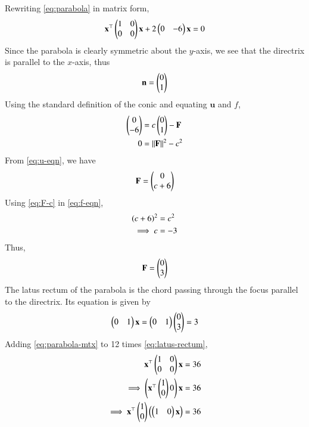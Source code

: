 \documentclass[journal,12pt,twocolumn]{IEEEtran}
\renewcommand{\vec}[1]{\boldsymbol{\mathbf{#1}}}
\begin{document}
\begin{enumerate}
    \solution Rewriting \eqref{eq:parabola} in matrix form,
    \begin{align}
        \vec{x}^\top\myvec{1&0\\0&0}\vec{x} + 2\myvec{0&-6}\vec{x} = 0
        \label{eq:parabola-mtx}
    \end{align}
    Since the parabola is clearly symmetric about the $y$-axis, we see that
    the directrix is parallel to the $x$-axis, thus
    \begin{align}
        \vec{n} = \myvec{0\\1}
        \label{eq:n}
    \end{align}
    Using the standard definition of the conic and equating $\vec{u}$ and $f$,
    \begin{align}
        \myvec{0\\-6} &= c\myvec{0\\1} - \vec{F} \label{eq:u-eqn} \\
        0 &= \norm{\vec{F}}^2 - c^2 \label{eq:f-eqn}
    \end{align}
    From \eqref{eq:u-eqn}, we have
    \begin{align}
        \vec{F} = \myvec{0\\c+6}
        \label{eq:F-c}
    \end{align}
    Using \eqref{eq:F-c} in \eqref{eq:f-eqn},
    \begin{align}
        \left(c+6\right)^2&=c^2 \\
        \implies c&=-3
        \label{eq:c-sol}
    \end{align}
    Thus,
    \begin{align}
        \vec{F} = \myvec{0\\3}
    \end{align}
    The latus rectum of the parabola is the chord passing through the focus 
    parallel to the directrix. Its equation is given by
    \begin{align}
        \myvec{0&1}\vec{x} = \myvec{0&1}\myvec{0\\3} = 3
        \label{eq:latus-rectum}
    \end{align}
    Adding \eqref{eq:parabola-mtx} to 12 times \eqref{eq:latus-rectum},
    \begin{align}
        \vec{x}^\top\myvec{1&0\\0&0}\vec{x} &= 36 \\
        \implies \myvec{\vec{x}^\top\myvec{1\\0} 0}\vec{x} &= 36 \\
        \implies \vec{x}^\top\myvec{1\\0}\brak{\myvec{1&0}\vec{x}} &= 36 \\

\end{align}
\end{enumerate}
\end{document}
